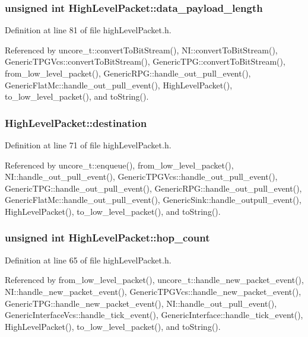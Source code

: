 \subsubsection[{data\_\-payload\_\-length}]{\setlength{\rightskip}{0pt plus 5cm}unsigned int {\bf HighLevelPacket::data\_\-payload\_\-length}}\label{classHighLevelPacket_c7bf05e9b1560991d60ca12fd0d309a3}




Definition at line 81 of file highLevelPacket.h.

Referenced by uncore\_\-t::convertToBitStream(), NI::convertToBitStream(), GenericTPGVcs::convertToBitStream(), GenericTPG::convertToBitStream(), from\_\-low\_\-level\_\-packet(), GenericRPG::handle\_\-out\_\-pull\_\-event(), GenericFlatMc::handle\_\-out\_\-pull\_\-event(), HighLevelPacket(), to\_\-low\_\-level\_\-packet(), and toString().
\subsubsection[{destination}]{ {\bf HighLevelPacket::destination}}\label{classHighLevelPacket_abe7a75c784f1824211ba194819e0d4e}




Definition at line 71 of file highLevelPacket.h.

Referenced by uncore\_\-t::enqueue(), from\_\-low\_\-level\_\-packet(), NI::handle\_\-out\_\-pull\_\-event(), GenericTPGVcs::handle\_\-out\_\-pull\_\-event(), GenericTPG::handle\_\-out\_\-pull\_\-event(), GenericRPG::handle\_\-out\_\-pull\_\-event(), GenericFlatMc::handle\_\-out\_\-pull\_\-event(), GenericSink::handle\_\-outpull\_\-event(), HighLevelPacket(), to\_\-low\_\-level\_\-packet(), and toString().
\subsubsection[{hop\_\-count}]{\setlength{\rightskip}{0pt plus 5cm}unsigned int {\bf HighLevelPacket::hop\_\-count}}\label{classHighLevelPacket_ffa29cc3a49b36a798ae083a6f80f8e5}




Definition at line 65 of file highLevelPacket.h.

Referenced by from\_\-low\_\-level\_\-packet(), uncore\_\-t::handle\_\-new\_\-packet\_\-event(), NI::handle\_\-new\_\-packet\_\-event(), GenericTPGVcs::handle\_\-new\_\-packet\_\-event(), GenericTPG::handle\_\-new\_\-packet\_\-event(), NI::handle\_\-out\_\-pull\_\-event(), GenericInterfaceVcs::handle\_\-tick\_\-event(), GenericInterface::handle\_\-tick\_\-event(), HighLevelPacket(), to\_\-low\_\-level\_\-packet(), and toString().
